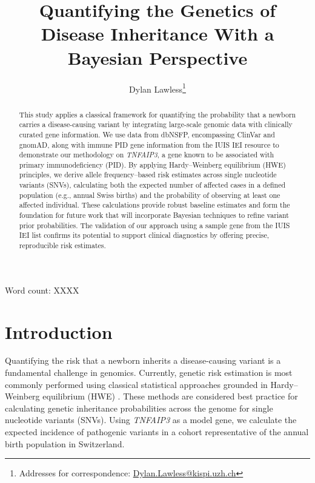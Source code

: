 
\usepackage[printonlyused,withpage,nohyperlinks]{acronym}
\usepackage{tikz}
\usetikzlibrary{calc}
\usepackage{amsmath, amssymb}


\title{Quantifying the Genetics of Disease Inheritance With a Bayesian Perspective}

\author[1]{Dylan Lawless\thanks{Addresses for correspondence: \href{mailto:Dylan.Lawless@kispi.uzh.ch}{Dylan.Lawless@kispi.uzh.ch}}}


\maketitle
\justify

Word count: XXXX


\begin{abstract}
This study applies a classical framework for quantifying the probability that a newborn carries a disease-causing variant by integrating large-scale genomic data with clinically curated gene information. We use data from dbNSFP, encompassing ClinVar and gnomAD, along with immune PID gene information from the IUIS IEI resource to demonstrate our methodology on \textit{TNFAIP3}, a gene known to be associated with primary immunodeficiency (PID). By applying Hardy–Weinberg equilibrium (HWE) principles, we derive allele frequency–based risk estimates across single nucleotide variants (SNVs), calculating both the expected number of affected cases in a defined population (e.g., annual Swiss births) and the probability of observing at least one affected individual. These calculations provide robust baseline estimates and form the foundation for future work that will incorporate Bayesian techniques to refine variant prior probabilities. The validation of our approach using a sample gene from the IUIS IEI list confirms its potential to support clinical diagnostics by offering precise, reproducible risk estimates.
\end{abstract}

\section{Introduction}
Quantifying the risk that a newborn inherits a disease-causing variant is a fundamental challenge in genomics. Currently, genetic risk estimation is most commonly performed using classical statistical approaches grounded in Hardy–Weinberg equilibrium (HWE)
\cite{MayoCentury2008, AbramovsHardyWeinberg2020}. 
These methods are considered best practice for calculating genetic inheritance probabilities across the genome for single nucleotide variants (SNVs). Using \textit{TNFAIP3} as a model gene, we calculate the expected incidence of pathogenic variants in a cohort representative of the annual birth population in Switzerland.


